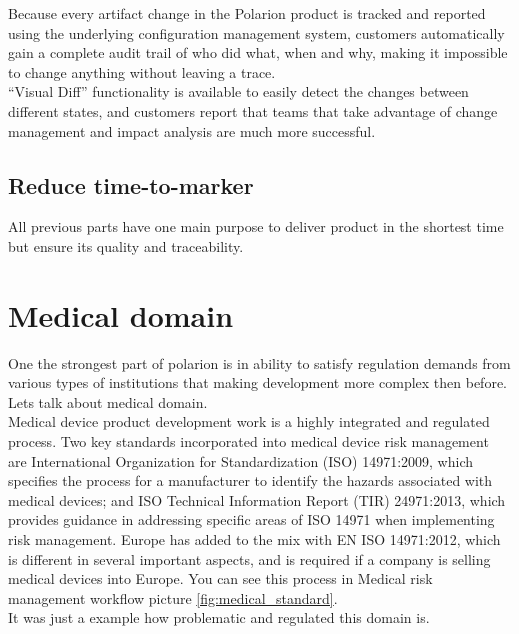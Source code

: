 \documentclass[thesis=M,english]{FITthesis}[2012/06/26]
\begin{document}
Because every artifact change in the Polarion product is tracked and reported using the underlying configuration management system, customers automatically gain a complete audit trail of who did what, when and why, making it impossible to change anything without leaving a trace.\\

“Visual Diff” functionality is available to easily detect the changes between different states, and customers report that teams that take advantage of change management and impact analysis are much more successful.

\subsection{Reduce time-to-marker}

All previous parts have one main purpose to deliver product in the shortest time but ensure its quality and traceability.\\
 

\section{Medical domain}

One the strongest part of \acrshort{polarion} is in ability to satisfy regulation demands from various types of institutions that making development more complex then before. \\

Lets talk about medical domain.\\

Medical device product development work is a highly integrated and regulated process. Two key standards incorporated into medical device risk management are International Organization for Standardization (ISO) 14971:2009, which specifies the process for a manufacturer to identify the hazards associated with medical devices; and ISO Technical Information Report (TIR) 24971:2013, which provides guidance in addressing specific areas of ISO 14971 when implementing risk management. Europe has added to the mix with EN ISO 14971:2012, which is different in several important aspects, and is required if a company is selling medical devices into Europe. You can see this process in Medical risk management workflow picture \ref{fig:medical_standard}.\\

It was just a example how problematic and regulated this domain is.\\
\end{document}
